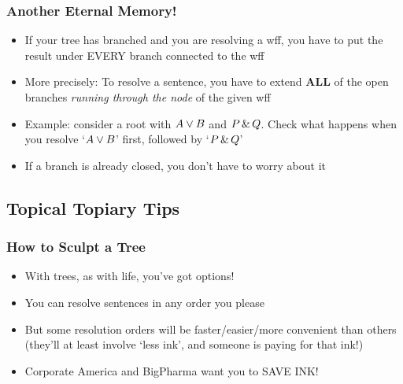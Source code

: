 \begin{frame}
\frametitle{Another Eternal Memory!}

\begin{itemize}[<+->]

\item If your tree has branched and you are resolving a wff, you have to put the result under EVERY branch connected to the wff

\item More precisely: To resolve a sentence, you have to extend \textbf{ALL} of the open branches \textit{running through the node} of the given wff

\item Example: consider a root with $A \vee B$ and $P \,\&\, Q$. Check what happens when you resolve `$A \vee B$' first, followed by `$P \,\&\, Q$'

\item If a branch is already closed, you don't have to worry about it 

\end{itemize}
\end{frame}

\subsection{Topical Topiary Tips}

\begin{frame}
\frametitle{How to Sculpt a Tree}

\begin{itemize}[<+->]

\item With trees, as with life, you've got options!

\item You can resolve sentences in any order you please

\item But some resolution orders will be faster/easier/more convenient than others (they'll at least involve `less ink', and someone is paying for that ink!)

\item Corporate America and BigPharma want you to SAVE INK! 

\end{itemize}
\end{frame}

